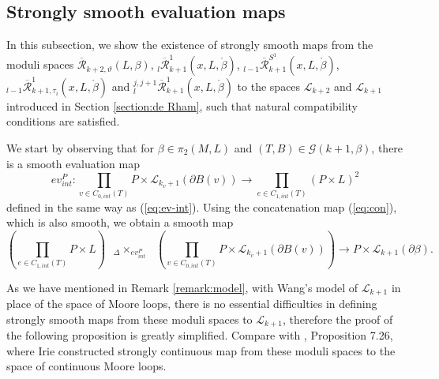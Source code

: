 \documentclass[a4paper]{article}
\numberwithin{equation}{section}
\begin{document}
\subsection{Strongly smooth evaluation maps}\label{section:smooth}

In this subsection, we show the existence of strongly smooth maps from the moduli spaces $\overline{\mathcal{R}}_{k+2,\vartheta}(L,\beta)$, ${}_l\overline{\mathcal{R}}_{k+1}^1(x,L,\ring{\beta})$, ${}_{l-1}\overline{\mathcal{R}}_{k+1}^{S^1}(x,L,\ring{\beta})$, ${}_{l-1}\overline{\mathcal{R}}_{k+1,\tau_i}^1(x,L,\ring{\beta})$ and ${}_l^{j,j+1}\overline{\mathcal{R}}_{k+1}^1(x,L,\ring{\beta})$ to the spaces $\mathcal{L}_{k+2}$ and $\mathcal{L}_{k+1}$ introduced in Section \ref{section:de Rham}, such that natural compatibility conditions are satisfied. 

We start by observing that for $\beta\in\pi_2(M,L)$ and $(T,B)\in\mathcal{G}(k+1,\beta)$, there is a smooth evaluation map
\begin{equation}
\mathit{ev}_\mathit{int}^P:\prod_{v\in C_{0,\mathit{int}}(T)}P\times\mathcal{L}_{k_v+1}(\partial B(v))\rightarrow\prod_{e\in C_{1,\mathit{int}}(T)}(P\times L)^2
\end{equation}
defined in the same way as (\ref{eq:ev-int}). Using the concatenation map (\ref{eq:con}), which is also smooth, we obtain a smooth map
\begin{equation}\label{eq:ev-con}
\left(\prod_{e\in C_{1,\mathit{int}}(T)}P\times L\right)\textrm{ }{{}_\Delta\times_{\mathit{ev}_\mathit{int}^P}}\textrm{ }\left(\prod_{v\in C_{0,\mathit{int}}(T)}P\times\mathcal{L}_{k_v+1}(\partial B(v))\right)\rightarrow P\times\mathcal{L}_{k+1}(\partial\beta).
\end{equation}

As we have mentioned in Remark \ref{remark:model}, with Wang's model of $\mathcal{L}_{k+1}$ in place of the space of Moore loops, there is no essential difficulties in defining strongly smooth maps from these moduli spaces to $\mathcal{L}_{k+1}$, therefore the proof of the following proposition is greatly simplified. Compare with \cite{ki2}, Proposition 7.26, where Irie constructed strongly continuous map from these moduli spaces to the space of continuous Moore loops.
\end{document}
